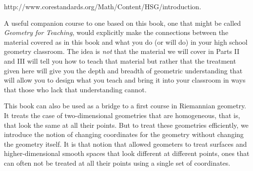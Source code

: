 \begin{center}
http://www.corestandards.org/Math/Content/HSG/introduction.
\end{center}

A useful companion course to one based on this book, one that might be called
\textit{Geometry for Teaching}, would explicitly make the connections between
the material covered as in this book and what you do (or will do) in your high
school geometry classroom. The idea is \textit{not} that the material we will
cover in Parts II and III will tell you how to teach that material but rather
that the treatment given here will give you the depth and breadth of geometric
understanding that will allow you to design what you teach and bring it into
your classroom in ways that those who lack that understanding cannot.

\begin{remark}
This book can also be used as a bridge to a first course in Riemannian
geometry. It treats the case of two-dimensional geometries that are
homogeneous, that is, that look the same at all their points. But to treat
these geometries efficiently, we introduce the notion of changing coordinates
for the geometry without changing the geometry itself. It is that notion that
allowed geometers to treat surfaces and higher-dimensional smooth spaces that
look different at different points, ones that can often not be treated at all
their points using a single set of coordinates.
\end{remark}
